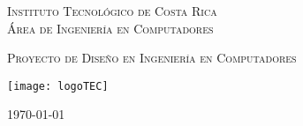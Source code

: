 
\thispagestyle{empty} 

\begin{center}

\textsc{\LARGE Instituto Tecnol\'ogico de Costa Rica} \\
\textsc{\Large \'Area de Ingenier\'ia en Computadores}

\textsc{\Large Proyecto de Dise\~no en Ingenier\'ia en Computadores}


\par\vspace{20mm}

\texttt{[image: logoTEC]}

\par\vspace*{\fill}

{\LARGE\bf{\textsf{ \Huge \scriptTitle}}}

\par\vspace*{\fill}



\textsc{\Large \scriptAuthor}

\vspace*{\fill}

{\today}

\end{center}
\newpage 
\cleardoublepage  
